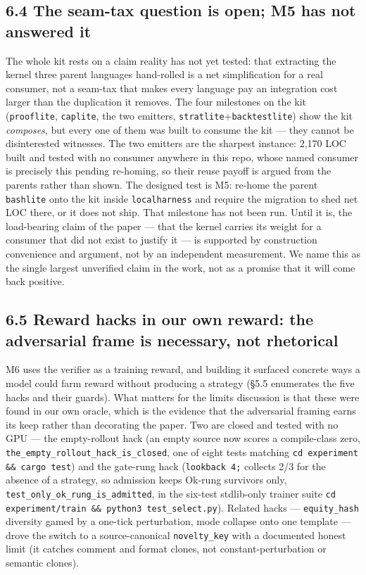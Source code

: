 \documentclass[11pt]{article}
\newcommand{\code}[1]{\texttt{#1}}
\begin{document}
\subsection*{6.4 The seam-tax question is open; M5 has not answered it}

The whole kit rests on a claim reality has not yet tested: that extracting the
kernel three parent languages hand-rolled is a net simplification for a real
consumer, not a seam-tax that makes every language pay an integration cost
larger than the duplication it removes. The four milestones on the kit
(\code{prooflite}, \code{caplite}, the two emitters, \code{stratlite}+\code{backtestlite}) show the
kit \emph{composes}, but every one of them was built to consume the kit --- they cannot
be disinterested witnesses. The two emitters are the sharpest instance: 2,170
LOC built and tested with no consumer anywhere in this repo, whose named
consumer is precisely this pending re-homing, so their reuse payoff is argued
from the parents rather than shown. The designed test is M5: re-home the parent
\code{bashlite} onto the kit inside \code{localharness} and require the migration to shed
net LOC there, or it does not ship. That milestone has not been run. Until it
is, the load-bearing claim of the paper --- that the kernel carries its weight for
a consumer that did not exist to justify it --- is supported by construction
convenience and argument, not by an independent measurement. We name this as the
single largest unverified claim in the work, not as a promise that it will come
back positive.

\subsection*{6.5 Reward hacks in our own reward: the adversarial frame is necessary, not rhetorical}

M6 uses the verifier as a training reward, and building it surfaced concrete
ways a model could farm reward without producing a strategy (\S{}5.5 enumerates the
five hacks and their guards). What matters for the limits discussion is that
these were found in our own oracle, which is the evidence that the adversarial
framing earns its keep rather than decorating the paper. Two are closed and
tested with no GPU --- the empty-rollout hack (an empty source now scores a
compile-class zero, \code{the\_empty\_rollout\_hack\_is\_closed}, one of eight tests
matching \code{cd experiment \&\& cargo test}) and the gate-rung hack (\code{lookback 4;}
collects 2/3 for the absence of a strategy, so admission keeps Ok-rung survivors
only, \code{test\_only\_ok\_rung\_is\_admitted}, in the six-test stdlib-only trainer suite
\code{cd experiment/train \&\& python3 test\_select.py}). Related hacks ---
\code{equity\_hash} diversity gamed by a one-tick perturbation, mode collapse onto one
template --- drove the switch to a source-canonical \code{novelty\_key} with a
documented honest limit (it catches comment and format clones, not
constant-perturbation or semantic clones).
\end{document}
